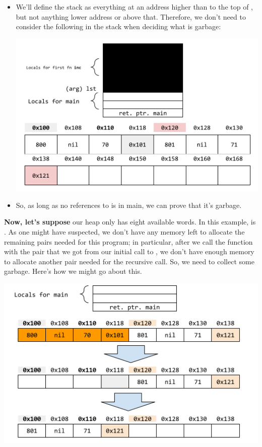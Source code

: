 \documentclass[letterpaper]{article}
\begin{document}
\begin{itemize}
    \item We'll define the stack as everything at an address higher than  to the top of , but not anything lower address or above that. Therefore, we don't need to consider the following in the stack when deciding what is garbage: 
    \begin{center}
        \includegraphics[scale=0.5]{../assets/stackHeapPairGC3.png}
    \end{center}

    \item So, as long as no references to  is in main, we can prove that it's garbage.
\end{itemize}
\textbf{Now, let's suppose} our heap only has eight available words. In this example,  is . As one might have suspected, we don't have any memory left to allocate the remaining pairs needed for this program; in particular, after we call the  function with the pair that we got from our initial call to , we don't have enough memory to allocate another pair needed for the recursive call. So, we need to collect some garbage. Here's how we might go about this. 
\begin{center}
    \includegraphics[scale=0.7]{../assets/stackHeapPairGCFix4.png}
\end{center}
\end{document}
